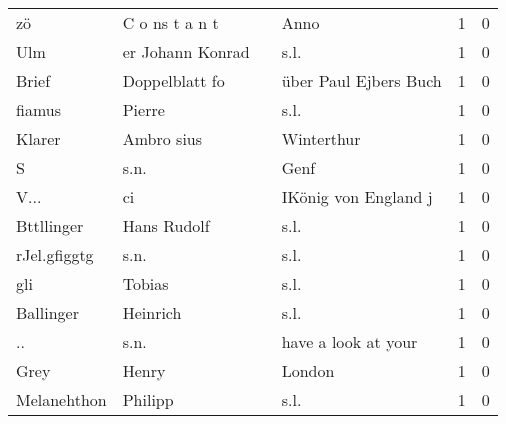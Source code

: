 \begin{center}
\begin{tiny}
\begin{longtabu}{llllrr}
                       zö &                     C o ns t a n t &             &                                        Anno &          1 &         0 \\
                      Ulm &                   er Johann Konrad &             &                                        s.l. &          1 &         0 \\
                    Brief &                     Doppelblatt fo &             &                       über Paul Ejbers Buch &          1 &         0 \\
                   fiamus &                             Pierre &             &                                        s.l. &          1 &         0 \\
                   Klarer &                         Ambro sius &             &                                  Winterthur &          1 &         0 \\
                        S &                               s.n. &             &                                        Genf &          1 &         0 \\
                     V... &                                 ci &             &                        IKönig von England j &          1 &         0 \\
               Bttllinger &                        Hans Rudolf &             &                                        s.l. &          1 &         0 \\
             rJel.gfiggtg &                               s.n. &             &                                        s.l. &          1 &         0 \\
                      gli &                             Tobias &             &                                        s.l. &          1 &         0 \\
                Ballinger &                           Heinrich &             &                                        s.l. &          1 &         0 \\
                       .. &                               s.n. &             &                         have a look at your &          1 &         0 \\
                     Grey &                              Henry &             &                                      London &          1 &         0 \\
              Melanehthon &                            Philipp &             &                                        s.l. &          1 &         0 \\

\end{longtabu}
\end{tiny}
\end{center}
